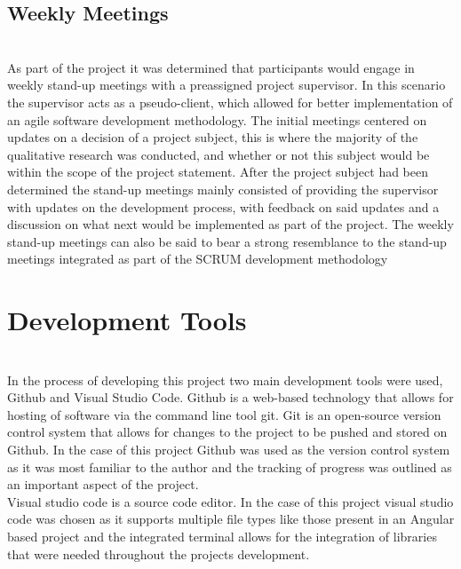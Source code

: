 \subsection{Weekly Meetings} \\
As part of the project it was determined that participants would engage in weekly stand-up meetings with a preassigned project supervisor. In this scenario the supervisor acts as a pseudo-client, which allowed for better implementation of an agile software development methodology. The initial meetings centered on updates on a decision of a project subject, this is where the majority of the qualitative research was conducted, and whether or not this subject would be within the scope of the project statement. After the project subject had been determined the stand-up meetings mainly consisted of providing the supervisor with updates on the development process, with feedback on said updates and a discussion on what next would be implemented as part of the project. The weekly stand-up meetings can also be said to bear a strong resemblance to the stand-up meetings integrated as part of the SCRUM development methodology

\section{Development Tools} \\
In the process of developing this project two main development tools were used, Github and Visual Studio Code. Github is a web-based technology that allows for hosting of software via the command line tool git. Git is an open-source version control system that allows for changes to the project to be pushed and stored on Github. In the case of this project Github was used as the version control system as it was most familiar to the author and the tracking of progress was outlined as an important aspect of the project.\\
Visual studio code is a source code editor. In the case of this project visual studio code was chosen as it supports multiple file types like those present in an Angular based project and the integrated terminal allows for the integration of libraries that were needed throughout the projects development.



